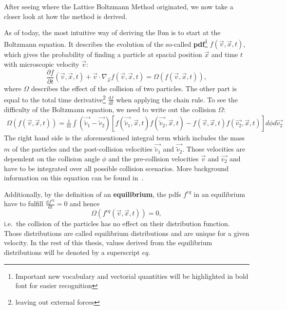 After seeing where the Lattice Boltzmann Method originated, we now take a closer look at how the method is derived.

As of today, the most intuitive way of deriving the \gls{lbm} is to start at the Boltzmann equation.
It describes the evolution of the so-called \textbf{\gls{pdf}}\footnote{Important new vocabulary and vectorial quantities will be highlighted in bold font for easier recognition} $f(\vec{v},\vec{x},t)$, which gives the probability of finding a particle at spacial position $\vec{x}$ and time $t$ with microscopic velocity $\vec{v}$:
\begin{equation}
  \label{eq: Boltzmann transport equation}
  \frac{\partial f}{\partial t} (\vec{v},\vec{x},t) + \vec{v} \cdot \nabla_{\vec{x}} f(\vec{v},\vec{x},t) = \Omega\left(f(\vec{v},\vec{x},t)\right),
\end{equation}
where $\Omega$ describes the effect of the collision of two particles. The other part is equal to the total time derivative\footnote{leaving out external forces} $\frac{\text{d}f}{\text{d}t}$ when applying the chain rule.
To see the difficulty of the Boltzmann equation, we need to write out the collision $\Omega$:
\begin{equation}
  \label{eq: Collision of boltzmann equation}
  \begin{aligned}
 \Omega\left(f(\vec{v},\vec{x},t)\right) =\frac{1}{m}
  \int \left( \vec{\tilde{v}_1}-\vec{\tilde{v}_2}\right)
  \left[
    f(\vec{\tilde{v}_1},\vec{x},t)f(\vec{\tilde{v}_2},\vec{x},t)
    -f(\vec{v},\vec{x},t)f(\vec{v_2},\vec{x},t)
  \right] d\phi d\vec{v_2}
\end{aligned}
\end{equation}
The right hand side is the aforementioned integral term which includes the mass $m$ of the particles and the post-collision velocities $\vec{\tilde{v}_1}$ and $\vec{\tilde{v}_2}$.
Those velocities are dependent on the collision angle $\phi$ and the pre-collision velocities $\vec{v}$ and $\vec{v_2}$ and have to be integrated over all possible collision scenarios.
More background information on this equation can be found in~\cite{harris2004introduction}.

Additionally, by the definition of an \textbf{equilibrium}, the \glspl{pdf} $f^{eq}$ in an equilibrium have to fulfill $\frac{\text{d}f^{eq}}{\text{d}t}=0$ and hence
\begin{equation}
  \Omega(f^{eq}(\vec{v},\vec{x},t)) = 0,
\end{equation}
i.e.\ the collision of the particles has no effect on their distribution function.
Those distributions are called equilibrium distributions and are unique for a given velocity.
In the rest of this thesis, values derived from the equilibrium distributions will be denoted by a superscript $eq$.

